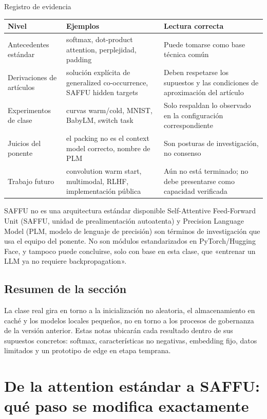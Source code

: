 \documentclass[a4paper]{article}
\begin{document}
\begin{knowledgebox}{Registro de evidencia}
\begin{tabularx}{\textwidth}{L{0.17\textwidth} L{0.29\textwidth} X}
\toprule
Nivel & Ejemplos & Lectura correcta \\
\midrule
Antecedentes estándar & softmax, dot-product attention, perplejidad, padding & Puede tomarse como base técnica común \\
Derivaciones de artículos & solución explícita de generalized co-occurrence, SAFFU hidden targets & Deben respetarse los supuestos y las condiciones de aproximación del artículo \\
Experimentos de clase & curvas warm/cold, MNIST, BabyLM, switch task & Solo respaldan lo observado en la configuración correspondiente \\
Juicios del ponente & el packing no es el context model correcto, nombre de PLM & Son posturas de investigación, no consenso \\
Trabajo futuro & convolution warm start, multimodal, RLHF, implementación pública & Aún no está terminado; no debe presentarse como capacidad verificada \\
\bottomrule
\end{tabularx}
\end{knowledgebox}

\begin{warningbox}{SAFFU no es una arquitectura estándar disponible}
Self-Attentive Feed-Forward Unit (SAFFU, unidad de prealimentación autoatenta) y Precision Language Model (PLM, modelo de lenguaje de precisión) son términos de investigación que usa el equipo del ponente. No son módulos estandarizados en PyTorch/Hugging Face, y tampoco puede concluirse, solo con base en esta clase, que «entrenar un LLM ya no requiere backpropagation».
\end{warningbox}

\subsection{Resumen de la sección}

La clase real gira en torno a la inicialización no aleatoria, el almacenamiento en caché y los modelos locales pequeños, no en torno a los procesos de gobernanza de la versión anterior. Estas notas ubicarán cada resultado dentro de sus supuestos concretos: softmax, características no negativas, embedding fijo, datos limitados y un prototipo de edge en etapa temprana.
\section{De la attention estándar a SAFFU: qué paso se modifica exactamente}
\end{document}
